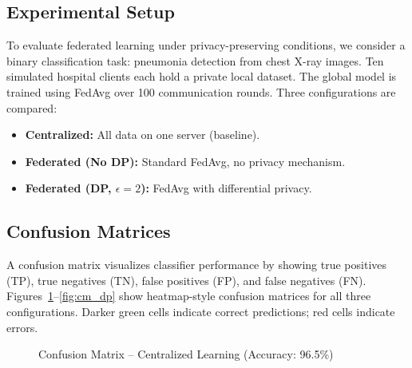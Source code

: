 \documentclass[conference]{IEEEtran}
\begin{document}
\subsection{Experimental Setup}

To evaluate federated learning under privacy-preserving conditions, we consider a binary classification task: pneumonia detection from chest X-ray images. Ten simulated hospital clients each hold a private local dataset. The global model is trained using FedAvg over 100 communication rounds. Three configurations are compared:

\begin{itemize}
    \item \textbf{Centralized:} All data on one server (baseline).
    \item \textbf{Federated (No DP):} Standard FedAvg, no privacy mechanism.
    \item \textbf{Federated (DP, $\epsilon=2$):} FedAvg with differential privacy.
\end{itemize}

\subsection{Confusion Matrices}

A confusion matrix visualizes classifier performance by showing true positives (TP), true negatives (TN), false positives (FP), and false negatives (FN). Figures~\ref{fig:cm_central}--\ref{fig:cm_dp} show heatmap-style confusion matrices for all three configurations. Darker green cells indicate correct predictions; red cells indicate errors.


\begin{figure}[H]
\centering
{}
\caption{Confusion Matrix -- Centralized Learning (Accuracy: 96.5\%)}
\label{fig:cm_central}
\end{figure}
\end{document}
